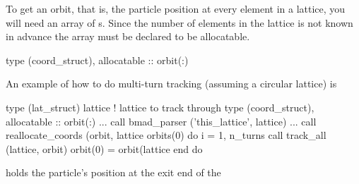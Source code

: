 To get an orbit, that is, the particle position at every element in a
lattice, you will need an array of s. Since the
number of elements in the lattice is not known in advance the array
must be declared to be allocatable.
\begin{example}
  type (coord_struct), allocatable :: orbit(:)
\end{example}
An example of how to do multi-turn tracking (assuming a circular lattice) is
\begin{example}
  type (lat_struct) lattice             ! lattice to track through
  type (coord_struct), allocatable :: orbit(:)
  ...
  call bmad_parser ('this_lattice', lattice)
  ...
  call reallocate_coords (orbit, lattice%
  orbits(0)%
  do i = 1, n_turns
    call track_all (lattice, orbit)
    orbit(0) = orbit(lattice%
  end do
\end{example}
 holds the particle's position at the exit end of the
